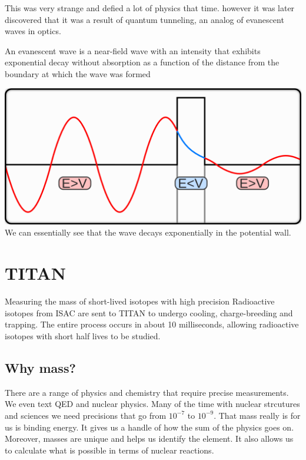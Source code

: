\documentclass[english, 11pt]{article}
\begin{document}
        This was very strange and defied a lot of physics that time. however it was later discovered that it was a result of quantum tunneling, an analog of evanescent waves in optics. 

        \begin{defn}
          An evanescent wave is a near-field wave with an intensity that exhibits exponential decay without absorption as a function of the distance from the boundary at which the wave was formed
        \end{defn}

         

      \begin{center}
         \includegraphics[scale=0.7]{../img/qwave}\\
         We can essentially see that the wave decays exponentially in the potential wall.
      \end{center}

\section{TITAN}

Measuring the mass of short-lived isotopes with high precision
Radioactive isotopes from ISAC are sent to TITAN to undergo cooling, charge-breeding and trapping. The entire process occurs in about 10 milliseconds, allowing radioactive isotopes with short half lives to be studied. 

\subsection{Why mass?}

There are a range of physics and chemistry that require precise measurements. We even text QED and nuclear physics. Many of the time with nuclear strcutures and sciences we need precisions that go from $10^{-7}$ to $10^{-9}$. That mass really is for us is binding energy. It gives us a handle of how the sum of the physics goes on. Moreover, masses are unique and helps us identify the element. It also allows us to calculate what is possible in terms of nuclear reactions. 
\end{document}
